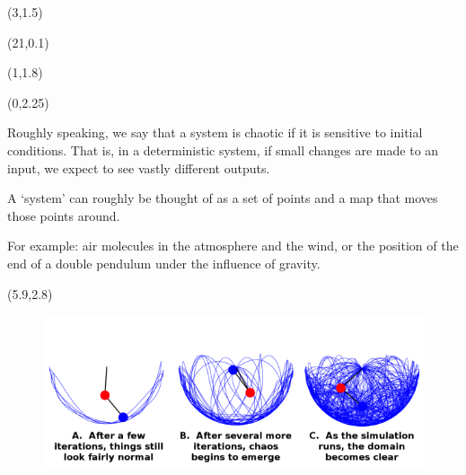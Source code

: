 \documentclass[a0,landscape]{a0poster}  %
\theoremstyle{plain}
\def\Hugehead#1{\noindent{\Huge\color{Saphire} #1}}
\begin{document}

\begin{textblock}{2}(3,1.5)

\end{textblock}

\begin{textblock}{1.8}(21,0.1)
\end{textblock}

\begin{textblock}{7}(1,1.8)
\Hugehead{What is Chaos?} %
\nocite{*}
\end{textblock}

\begin{textblock}{5.5}(0,2.25)
\Large{Roughly speaking, we say that a system is chaotic if it is sensitive to initial
conditions. That is, in a deterministic
system, if small changes are made to an input, we expect to see vastly different outputs.

A `system' can roughly be thought of as a set of points and a map that moves those points around. 

For example: air molecules in the atmosphere and the wind, or the position of the
end of a double pendulum under the influence of gravity. }
\end{textblock}

\begin{textblock}{2}(5.9,2.8)
\begin{figure}
\vspace{-3 mm}
\hspace{8mm}


\vspace{0 mm}
\includegraphics[scale=1]{./Pictures/doublePendulum.png}
\caption{}
\end{figure}
\end{textblock}
\end{document}
